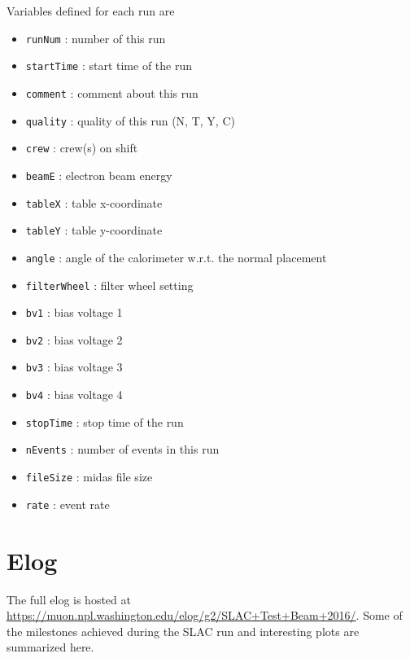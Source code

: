 Variables defined for each run are

\begin{itemize}
\item \verb+runNum+ : number of this run
\item \verb+startTime+ : start time of the run
\item \verb+comment+ : comment about this run 
\item \verb+quality+ : quality of this run (N, T, Y, C)
\item \verb+crew+ : crew(s) on shift 
\item \verb+beamE+ : electron beam energy 
\item \verb+tableX+ : table x-coordinate
\item \verb+tableY+ : table y-coordinate
\item \verb+angle+ : angle of the calorimeter w.r.t. the normal placement
\item \verb+filterWheel+ : filter wheel setting
\item \verb+bv1+ : bias voltage 1
\item \verb+bv2+ : bias voltage 2 
\item \verb+bv3+ : bias voltage 3 
\item \verb+bv4+ : bias voltage 4 
\item \verb+stopTime+ : stop time of the run
\item \verb+nEvents+ : number of events in this run
\item \verb+fileSize+ : midas file size
\item \verb+rate+ : event rate
\end{itemize}

\section{Elog}

The full elog is hosted at \url{https://muon.npl.washington.edu/elog/g2/SLAC+Test+Beam+2016/}.
Some of the milestones achieved during the SLAC run and interesting plots are summarized here.

